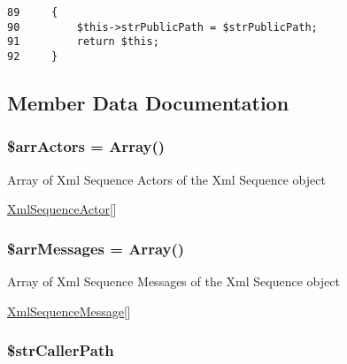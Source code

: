\begin{Code}\begin{verbatim}89     {
90         $this->strPublicPath = $strPublicPath;
91         return $this;
92     }
\end{verbatim}
\end{Code}




\subsection{Member Data Documentation}
\hypertarget{class_xml_sequence_51bd2c8dc9510ff43aaf11f3129bea0f}{
\subsubsection[{\$arrActors}]{\setlength{\rightskip}{0pt plus 5cm}\$arrActors = Array()}}
\label{class_xml_sequence_51bd2c8dc9510ff43aaf11f3129bea0f}


Array of Xml Sequence Actors of the Xml Sequence object

\hyperlink{class_xml_sequence_actor}{XmlSequenceActor}\mbox{[}\mbox{]} \hypertarget{class_xml_sequence_bc2745674d501af3a6d23b496ad9fd05}{
\subsubsection[{\$arrMessages}]{\setlength{\rightskip}{0pt plus 5cm}\$arrMessages = Array()}}
\label{class_xml_sequence_bc2745674d501af3a6d23b496ad9fd05}


Array of Xml Sequence Messages of the Xml Sequence object

\hyperlink{class_xml_sequence_message}{XmlSequenceMessage}\mbox{[}\mbox{]} \hypertarget{class_xml_sequence_80901f2e74e755896ca3914ff039dab9}{
\subsubsection[{\$strCallerPath}]{\setlength{\rightskip}{0pt plus 5cm}\$strCallerPath}}
\label{class_xml_sequence_80901f2e74e755896ca3914ff039dab9}


